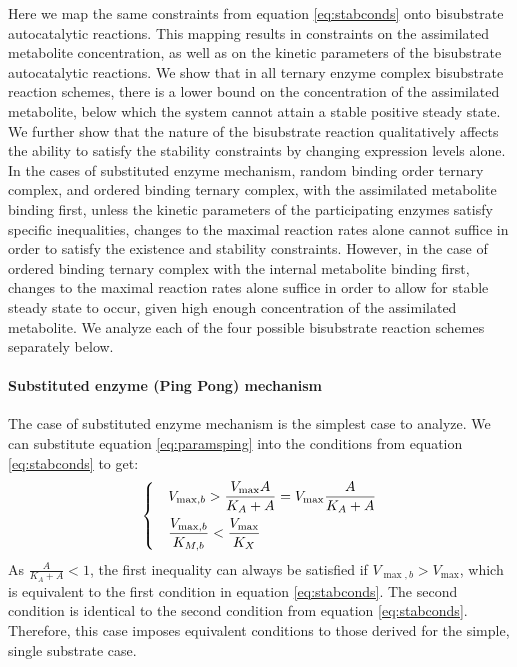   Here we map the same constraints from equation \ref{eq:stabconds} onto bisubstrate autocatalytic reactions.
  This mapping results in constraints on the assimilated metabolite concentration, as well as on the kinetic parameters of the bisubstrate autocatalytic reactions.
  We show that in all ternary enzyme complex bisubstrate reaction schemes, there is a lower bound on the concentration of the assimilated metabolite, below which the system cannot attain a stable positive steady state.
  We further show that the nature of the bisubstrate reaction qualitatively affects the ability to satisfy the stability constraints by changing expression levels alone.
  In the cases of substituted enzyme mechanism, random binding order ternary complex, and ordered binding ternary complex, with the assimilated metabolite binding first, unless the kinetic parameters of the participating enzymes satisfy specific inequalities, changes to the maximal reaction rates alone cannot suffice in order to satisfy the existence and stability constraints.
  However, in the case of ordered binding ternary complex with the internal metabolite binding first, changes to the maximal reaction rates alone suffice in order to allow for stable steady state to occur, given high enough concentration of the assimilated metabolite.
  We analyze each of the four possible bisubstrate reaction schemes separately below.

  \paragraph{Substituted enzyme (Ping Pong) mechanism}
  The case of substituted enzyme mechanism is the simplest case to analyze.
  We can substitute equation \ref{eq:paramsping} into the conditions from equation \ref{eq:stabconds} to get:
  \begin{equation}
    \label{eq:stabcondspingpong}
    \begin{dcases}
      & V_{\max,b}>\frac{V_{\max}A}{K_A+A}=V_{\max}\frac{A}{K_A+A} \\
      & \frac{V_{\max,b}}{K_{M,b}}<\frac{V_{\max}}{K_X}
    \end{dcases}
  \end{equation}
  As $\frac{A}{K_A+A}<1$, the first inequality can always be satisfied if $V_{\max,b}>V_{\max}$, which is equivalent to the first condition in equation \ref{eq:stabconds}.
  The second condition is identical to the second condition from equation \ref{eq:stabconds}.
  Therefore, this case imposes equivalent conditions to those derived for the simple, single substrate case.

